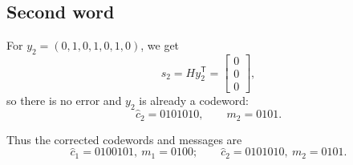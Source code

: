 \subsection*{Second word}

For \(y_2=(0,1,0,1,0,1,0)\), we get
\[
s_2 = H y_2^{\mathsf T} = \begin{bmatrix}0\\0\\0\end{bmatrix},
\]
so there is no error and \(y_2\) is already a codeword:
\[
\hat c_2 = 0101010,\qquad m_2 = 0101.
\]

\medskip
Thus the corrected codewords and messages are
\[
\boxed{\hat c_1 = 0100101,\ m_1 = 0100;\qquad
       \hat c_2 = 0101010,\ m_2 = 0101.}
\]
